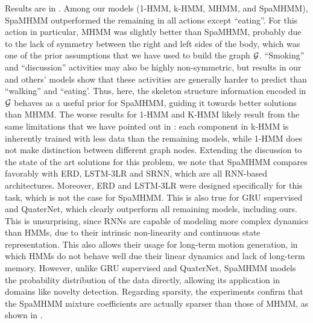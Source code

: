 Results are in . Among our models (1-HMM, k-HMM, MHMM, and SpaMHMM), SpaMHMM outperformed the remaining in all actions except ``eating''. For this action in particular, MHMM was slightly better than SpaMHMM, probably due to the lack of symmetry between the right and left sides of the body, which was one of the prior assumptions that we have used to build the graph ${\mathcal{G}}$. ``Smoking'' and ``discussion'' activities may also be highly non-symmetric, but results in our and others' models show that these activities are generally harder to predict than ``walking'' and ``eating'. Thus, here, the skeleton structure information encoded in ${\mathcal{G}}$ behaves as a useful prior for SpaMHMM, guiding it towards better solutions than MHMM. The worse results for 1-HMM and K-HMM likely result from the same limitations that we have pointed out in : each component in k-HMM is inherently trained with less data than the remaining models, while 1-HMM does not make distinction between different graph nodes. Extending the discussion to the state of the art solutions for this problem, we note that SpaMHMM compares favorably with ERD, LSTM-3LR and SRNN, which are all RNN-based architectures. Moreover, ERD and LSTM-3LR were designed specifically for this task, which is not the case for SpaMHMM. This is also true for GRU supervised and QuaterNet, which clearly outperform all remaining models, including ours. This is unsurprising, since RNNs are capable of modeling more complex dynamics than HMMs, due to their intrinsic non-linearity and continuous state representation. This also allows their usage for long-term motion generation, in which HMMs do not behave well due their linear dynamics and lack of long-term memory. However, unlike GRU supervised and QuaterNet, SpaMHMM  models the probability distribution of the data directly, allowing its application in domains like novelty detection. Regarding sparsity, the experiments confirm that the SpaMHMM mixture coefficients are actually sparser than those of MHMM, as shown in .

